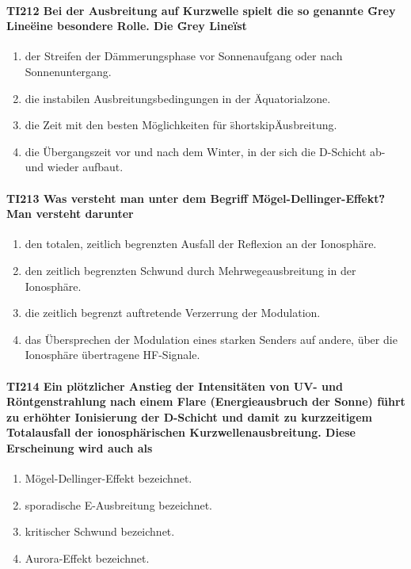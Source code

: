 \documentclass[8pt]{article}
\begin{document}
\paragraph*{TI212 Bei der Ausbreitung auf Kurzwelle spielt die so genannte \"Grey Line\" eine besondere Rolle. Die \"Grey Line\" ist} 
\begin{enumerate}[nolistsep,label=\Alph*]
\item der Streifen der Dämmerungsphase vor Sonnenaufgang oder nach Sonnenuntergang. 
\item die instabilen Ausbreitungsbedingungen in der Äquatorialzone.
\item die Zeit mit den besten Möglichkeiten für \"shortskip\" Ausbreitung.
\item die Übergangszeit vor und nach dem Winter, in der sich die D-Schicht ab- und wieder aufbaut. 
\end{enumerate}

\paragraph*{TI213 Was versteht man unter dem Begriff \"Mögel-Dellinger-Effekt\"? Man versteht darunter} 
\begin{enumerate}[nolistsep,label=\Alph*]
\item den totalen, zeitlich begrenzten Ausfall der Reflexion an der Ionosphäre.
\item den zeitlich begrenzten Schwund durch Mehrwegeausbreitung in der Ionosphäre.
\item die zeitlich begrenzt auftretende Verzerrung der Modulation.
\item das Übersprechen der Modulation eines starken Senders auf andere, über die Ionosphäre übertragene HF-Signale.
\end{enumerate}

\paragraph*{TI214 Ein plötzlicher Anstieg der Intensitäten von UV- und Röntgenstrahlung nach einem Flare (Energieausbruch der Sonne) führt zu erhöhter Ionisierung der D-Schicht und damit zu kurzzeitigem Totalausfall der ionosphärischen Kurzwellenausbreitung. Diese Erscheinung wird auch als}
\begin{enumerate}[nolistsep,label=\Alph*]
\item Mögel-Dellinger-Effekt bezeichnet.
\item sporadische E-Ausbreitung bezeichnet.
\item kritischer Schwund bezeichnet.
\item Aurora-Effekt bezeichnet.
\end{enumerate}
\end{document}
